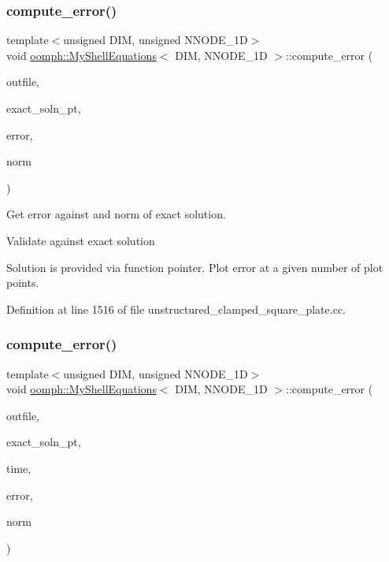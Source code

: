 \subsubsection{\texorpdfstring{compute\+\_\+error()}{compute\_error()}\hspace{0.1cm}{\footnotesize\ttfamily [1/2]}}
{\footnotesize\ttfamily template$<$unsigned D\+IM, unsigned N\+N\+O\+D\+E\+\_\+1D$>$ \\
void \hyperlink{classoomph_1_1MyShellEquations}{oomph\+::\+My\+Shell\+Equations}$<$ D\+IM, N\+N\+O\+D\+E\+\_\+1D $>$\+::compute\+\_\+error (\begin{DoxyParamCaption}\item[{std\+::ostream \&}]{outfile,  }\item[{Finite\+Element\+::\+Steady\+Exact\+Solution\+Fct\+Pt}]{exact\+\_\+soln\+\_\+pt,  }\item[{double \&}]{error,  }\item[{double \&}]{norm }\end{DoxyParamCaption})}



Get error against and norm of exact solution. 

Validate against exact solution

Solution is provided via function pointer. Plot error at a given number of plot points. 

Definition at line 1516 of file unstructured\+\_\+clamped\+\_\+square\+\_\+plate.\+cc.

\mbox{\label{classoomph_1_1MyShellEquations_a6a62a37fa44a5001c167071f9bf80c2f}} 
\subsubsection{\texorpdfstring{compute\+\_\+error()}{compute\_error()}\hspace{0.1cm}{\footnotesize\ttfamily [2/2]}}
{\footnotesize\ttfamily template$<$unsigned D\+IM, unsigned N\+N\+O\+D\+E\+\_\+1D$>$ \\
void \hyperlink{classoomph_1_1MyShellEquations}{oomph\+::\+My\+Shell\+Equations}$<$ D\+IM, N\+N\+O\+D\+E\+\_\+1D $>$\+::compute\+\_\+error (\begin{DoxyParamCaption}\item[{std\+::ostream \&}]{outfile,  }\item[{Finite\+Element\+::\+Unsteady\+Exact\+Solution\+Fct\+Pt}]{exact\+\_\+soln\+\_\+pt,  }\item[{const double \&}]{time,  }\item[{double \&}]{error,  }\item[{double \&}]{norm }\end{DoxyParamCaption})\hspace{0.3cm}{\ttfamily [inline]}}



